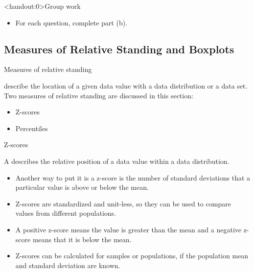 \documentclass[xcolor=table, handout]{beamer}
\begin{document}
\begin{frame}<handout:0>{Group work}
\begin{block}{}
\large
\begin{itemize}
\item For each question, complete part (b).
\end{itemize}
\end{block}
\end{frame}

\subsection{Measures of Relative Standing and Boxplots}

\begin{frame}{Measures of relative standing}
\begin{block}{}
\large
{} describe the location of a given data value with a data distribution or a data set.\\
\medskip
Two measures of relative standing are discussed in this section:
\begin{itemize}
\item Z-scores
\item Percentiles
\end{itemize}
\end{block}
\end{frame}

\begin{frame}{Z-scores}
\begin{block}{}
\large
A  describes the relative position of a data value within a data distribution.
\begin{itemize}
\pause
\item Another way to put it is a z-score is the number of standard deviations that a particular value is above or below the mean.
\pause
\item Z-scores are standardized and unit-less, so they can be used to compare values from different populations.
\pause
\item A positive z-score means the value is greater than the mean and a negative z-score means that it is below the mean. 
\pause
\item Z-scores can be calculated for samples or populations, if the population mean and standard deviation are known.
\end{itemize}
\end{block}
\end{frame}
\end{document}
